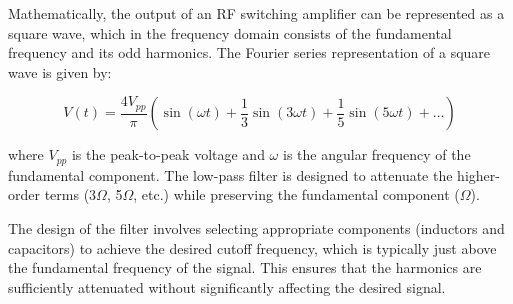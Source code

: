 Mathematically, the output of an RF switching amplifier can be represented as a square wave, which in the frequency domain consists of the fundamental frequency and its odd harmonics. The Fourier series representation of a square wave is given by:

\[
V(t) = \frac{4V_{pp}}{\pi} \left( \sin(\omega t) + \frac{1}{3}\sin(3\omega t) + \frac{1}{5}\sin(5\omega t) + \dots \right)
\]

where \( V_{pp} \) is the peak-to-peak voltage and \( \omega \) is the angular frequency of the fundamental component. The low-pass filter is designed to attenuate the higher-order terms (3$\Omega$, 5$\Omega$, etc.) while preserving the fundamental component ($\Omega$).

The design of the filter involves selecting appropriate components (inductors and capacitors) to achieve the desired cutoff frequency, which is typically just above the fundamental frequency of the signal. This ensures that the harmonics are sufficiently attenuated without significantly affecting the desired signal.

